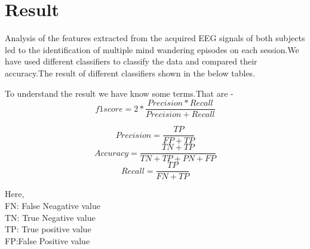 
\chapter{Result} %

\label{Chapter5} %





Analysis of the features extracted from the acquired EEG signals of both subjects led to the identification of multiple mind wandering episodes on each session.We have used different classifiers to classify the data and compared their accuracy.The result of different classifiers shown in the below tables.

To understand the result we have know some terms.That are -
\begin{equation}
    f1 score = 2 * \frac{Precision * Recall}{ Precision + Recall }
\end{equation}

\begin{equation}
    Precision = \frac{TP}{FP + TP}
\end{equation}
\begin{equation}
    Accuracy = \frac{TN + TP }{TN+TP+PN+FP}
\end{equation}
\begin{equation}
    Recall = \frac{TP}{ FN + TP}
\end{equation}

Here,\\
FN: False Neagative value \\
TN: True Negative value \\
TP: True positive value \\
FP:False Positive value \\

